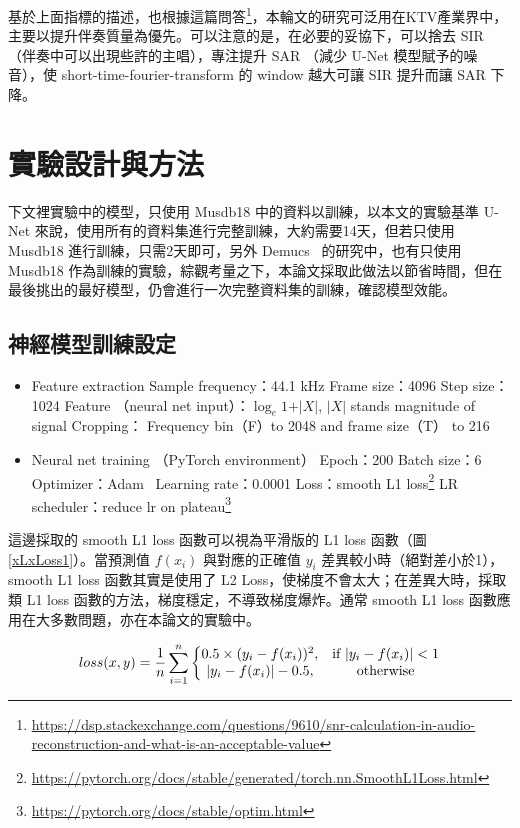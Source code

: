 基於上面指標的描述，也根據這篇問答\footnote{\url{https://dsp.stackexchange.com/questions/9610/snr-calculation-in-audio-reconstruction-and-what-is-an-acceptable-value}}，本輪文的研究可泛用在KTV產業界中，主要以提升伴奏質量為優先。可以注意的是，在必要的妥協下，可以捨去 SIR （伴奏中可以出現些許的主唱），專注提升 SAR （減少 U-Net 模型賦予的噪音），使 short-time-fourier-transform 的 window 越大可讓 SIR 提升而讓 SAR 下降。

\section{實驗設計與方法}
下文裡實驗中的模型，只使用 Musdb18 中的資料以訓練，以本文的實驗基準 U-Net 來說，使用所有的資料集進行完整訓練，大約需要14天，但若只使用 Musdb18 進行訓練，只需2天即可，另外 Demucs~\cite{defossez2019music} 的研究中，也有只使用 Musdb18 作為訓練的實驗，綜觀考量之下，本論文採取此做法以節省時間，但在最後挑出的最好模型，仍會進行一次完整資料集的訓練，確認模型效能。

\subsection{神經模型訓練設定}
\begin{itemize}
    \item Feature extraction
    \subitem Sample frequency：44.1 kHz
    \subitem Frame size：4096
    \subitem Step size：1024
    \subitem Feature （neural net input）：$\log_e{1+\vert X\vert} $, $\vert X\vert$ stands magnitude of signal
    \subitem Cropping： Frequency bin（F）to 2048 and frame size（T） to 216
    \item Neural net training （PyTorch environment）
    \subitem Epoch：200
    \subitem Batch size：6
    \subitem Optimizer：Adam~\cite{kingma2014adam}
    \subitem Learning rate：0.0001
    \subitem Loss：smooth L1 loss\footnote{\url{https://pytorch.org/docs/stable/generated/torch.nn.SmoothL1Loss.html}}
    \subitem LR scheduler：reduce lr on plateau\footnote{\url{https://pytorch.org/docs/stable/optim.html}}
\end{itemize}
這邊採取的 smooth L1 loss 函數可以視為平滑版的 L1 loss 函數（圖\ref{xLxLoss1}）。當預測值 $f(x_i)$ 與對應的正確值 $y_i$ 差異較小時（絕對差小於1），smooth L1 loss 函數其實是使用了 L2 Loss，使梯度不會太大；在差異大時，採取類 L1 loss 函數的方法，梯度穩定，不導致梯度爆炸。通常 smooth L1 loss 函數應用在大多數問題，亦在本論文的實驗中。

\begin{equation*}
    loss(x,y)=\frac{1}{n}\sum_{i=1}^{n}\left\{\begin{matrix}
        0.5 \times (y_i-f(x_i))^2,& \textup{if}\ \vert y_i-f(x_i)\vert < 1\\ 
        \vert y_i-f(x_i)\vert -0.5,& \textup{otherwise}
    \end{matrix}\right.
\end{equation*}


